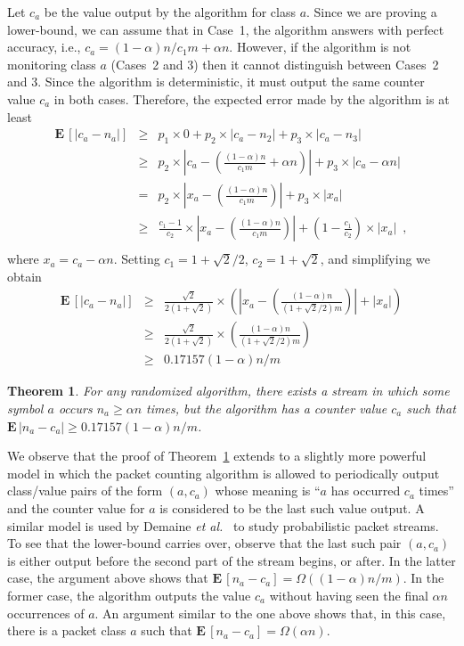 \documentclass[charterfonts,lotsofwhite]{patmorin}
\newcommand{\E}{\mathbf{E}\,}
\newtheorem{thm}{Theorem}{\bfseries}{\itshape}
\newcommand{\thmlabel}[1]{\label{thm:#1}}
\newcommand{\thmref}[1]{Theorem~\ref{thm:#1}}
\newcommand{\etal}{\emph{et al.}}
\begin{document}
Let $c_a$ be the value output by the algorithm for class $a$.  Since
we are proving a lower-bound, we can assume that in Case~1, the
algorithm answers with perfect accuracy, i.e.,
$c_a=(1-\alpha)n/c_1m+\alpha n$.  However, if the algorithm is not
monitoring class $a$ (Cases~2 and 3) then it cannot distinguish
between Cases~2 and 3.  Since the algorithm is deterministic, it must
output the same counter value $c_a$ in both cases.  Therefore, the
expected error made by the algorithm is at least
\begin{eqnarray*}
    \E[|c_a-n_a|] & \ge &
	p_1\times 0 + p_2\times|c_a-n_2| + p_3\times |c_a-n_3| \\
 	& \ge &	p_2\times\left|c_a
	-\left(\frac{(1-\alpha)n}{c_1m}+\alpha n\right) \right|
		+ p_3\times\left|c_a-\alpha n\right| \\
	& = & p_2\times\left|x_a
	- \left(\frac{(1-\alpha)n}{c_1m}\right) \right|
		+ p_3\times\left|x_a\right| \\
	& \ge & \frac{c_1-1}{c_2}\times\left|x_a
	- \left(\frac{(1-\alpha)n}{c_1m}\right) \right|
		+ \left(1-\frac{c_1}{c_2}\right)\times\left|x_a\right| \enspace , \\
\end{eqnarray*}
where $x_a=c_a-\alpha n$.  Setting $c_1=1+\sqrt{2}/2$,
$c_2=1+\sqrt{2}$, and simplifying we obtain
\begin{eqnarray*}
   \E[|c_a-n_a|] & \ge & \frac{\sqrt{2}}{2(1+\sqrt{2})}\times
	\left(\left|x_a-\left(\frac{(1-\alpha)n}{(1+\sqrt{2}/2)m}\right)\right|
	+ |x_a|\right) \\
	& \ge & \frac{\sqrt{2}}{2(1+\sqrt{2})}\times
		\left(\frac{(1-\alpha)n}{(1+\sqrt{2}/2)m}\right) \\
	& \ge & 0.17157(1-\alpha)n/m
\end{eqnarray*}

\begin{thm}\thmlabel{randomized}
For any randomized algorithm, there exists a stream in which some
symbol $a$ occurs $n_a\ge \alpha n$ times, but the algorithm has a
counter value $c_a$ such that $\E|n_a-c_a|\ge 0.17157(1-\alpha)n/m$.
\end{thm}

We observe that the proof of \thmref{randomized} extends to a slightly
more powerful model in which the packet counting algorithm is allowed
to periodically output class/value pairs of the form $(a,c_a)$ whose
meaning is ``$a$ has occurred $c_a$ times'' and the counter value for
$a$ is considered to be the last such value output.  A similar model
is used by Demaine \etal\ \cite{dlom02} to study probabilistic packet
streams.  To see that the lower-bound carries over, observe that the
last such pair $(a,c_a)$ is either output before the second part of
the stream begins, or after.  In the latter case, the argument above
shows that $\E[n_a-c_a]=\Omega((1-\alpha)n/m)$.  In the former case,
the algorithm outputs the value $c_a$ without having seen the final
$\alpha n$ occurrences of $a$.  An argument similar to the one above
shows that, in this case, there is a packet class $a$ such that
$\E[n_a-c_a]=\Omega(\alpha n)$.
\end{document}

